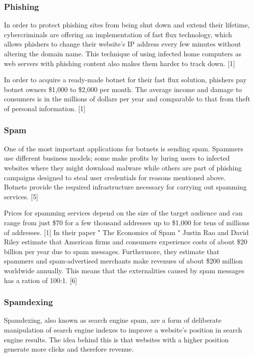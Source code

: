 		\subsubsection{Phishing}
		In order to protect phishing sites from being shut down and extend their lifetime, cybercriminals are offering an implementation of fast flux technology, which allows phishers to change their website's IP address every few minutes without altering the domain name. This technique of using infected home computers as web servers with phishing content also makes them harder to track down. [1]

In order to acquire a ready-made botnet for their fast flux solution, phishers pay botnet owners \$1,000 to \$2,000 per month. The average income and damage to consumers is in the millions of dollars per year and comparable to that from theft of personal information. [1]

		\subsubsection{Spam}
		One of the most important applications for botnets is sending spam. Spammers use different business models; some make profits by luring users to infected websites where they might download malware while others are part of phishing campaigns designed to steal user credentials for reasons mentioned above. Botnets provide the required infrastructure necessary for carrying out spamming services. [5]

Prices for spamming services depend on the size of the target audience and can range from just \$70 for a few thousand addresses up to \$1,000 for tens of millions of addresses. [1] In their paper " The Economics of Spam " Justin Rao and David Riley estimate that American firms and consumers experience costs of about \$20 billion per year due to spam messages. Furthermore, they estimate that spammers and spam-advertised merchants make revenues of about \$200 million worldwide annually. This means that the externalities caused by spam messages has a ration of 100:1. [6]

		\subsubsection{Spamdexing}
		Spamdexing, also known as search engine spam, are a form of deliberate manipulation of search engine indexes to improve a website's position in search engine results. The idea behind this is that websites with a higher position generate more clicks and therefore revenue. 


